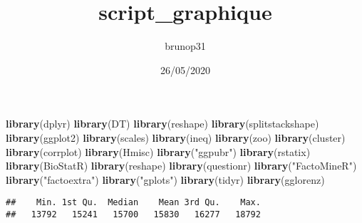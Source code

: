 \documentclass[
]{article}
\title{script\_graphique}
\author{brunop31}
\date{26/05/2020}
\newenvironment{Shaded}{\begin{snugshade}}{\end{snugshade}}
\newcommand{\CommentTok}[1]{\textcolor[rgb]{0.56,0.35,0.01}{\textit{#1}}}
\newcommand{\KeywordTok}[1]{\textcolor[rgb]{0.13,0.29,0.53}{\textbf{#1}}}
\newcommand{\NormalTok}[1]{#1}
\newcommand{\OperatorTok}[1]{\textcolor[rgb]{0.81,0.36,0.00}{\textbf{#1}}}
\newcommand{\StringTok}[1]{\textcolor[rgb]{0.31,0.60,0.02}{#1}}
\begin{document}
\maketitle

\begin{Shaded}
\begin{Highlighting}[]
\KeywordTok{library}\NormalTok{(dplyr)}
\KeywordTok{library}\NormalTok{(DT)}
\KeywordTok{library}\NormalTok{(reshape)}
\KeywordTok{library}\NormalTok{(splitstackshape)}
\KeywordTok{library}\NormalTok{(ggplot2)}
\KeywordTok{library}\NormalTok{(scales)}
\KeywordTok{library}\NormalTok{(ineq)}
\KeywordTok{library}\NormalTok{(zoo)}
\KeywordTok{library}\NormalTok{(cluster)}
\KeywordTok{library}\NormalTok{(corrplot)}
\KeywordTok{library}\NormalTok{(Hmisc)}
\KeywordTok{library}\NormalTok{(}\StringTok{"ggpubr"}\NormalTok{)}
\KeywordTok{library}\NormalTok{(rstatix)}
\KeywordTok{library}\NormalTok{(BioStatR)}
\KeywordTok{library}\NormalTok{(reshape)}
\KeywordTok{library}\NormalTok{(questionr)}
\KeywordTok{library}\NormalTok{(}\StringTok{"FactoMineR"}\NormalTok{)}
\KeywordTok{library}\NormalTok{(}\StringTok{"factoextra"}\NormalTok{)}
\KeywordTok{library}\NormalTok{(}\StringTok{"gplots"}\NormalTok{)}
\KeywordTok{library}\NormalTok{(tidyr)}
\KeywordTok{library}\NormalTok{(gglorenz)}
\end{Highlighting}
\end{Shaded}

\begin{Shaded}
\end{Shaded}

\begin{verbatim}
##    Min. 1st Qu.  Median    Mean 3rd Qu.    Max. 
##   13792   15241   15700   15830   16277   18792
\end{verbatim}

\begin{Shaded}
\end{Shaded}
\end{document}
